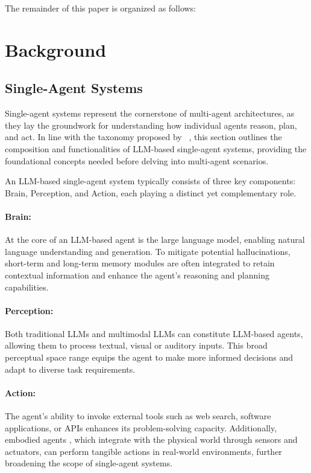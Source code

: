 The remainder of this paper is organized as follows:

\section{Background}
\subsection{Single-Agent Systems}
Single-agent systems represent the cornerstone of multi-agent architectures, as they lay the groundwork for understanding how individual agents reason, plan, and act. In line with the taxonomy proposed by ~\cite{single_agent_survey}, this section outlines the composition and functionalities of LLM-based single-agent systems, providing the foundational concepts needed before delving into multi-agent scenarios.

An LLM-based single-agent system typically consists of three key components: Brain, Perception, and Action, each playing a distinct yet complementary role.

\paragraph{Brain:}At the core of an LLM-based agent is the large language model, enabling natural language understanding and generation. To mitigate potential hallucinations, short-term and long-term memory modules are often integrated to retain contextual information and enhance the agent’s reasoning and planning capabilities.

\paragraph{Perception:}Both traditional LLMs and multimodal LLMs can constitute LLM-based agents, allowing them to process textual, visual or auditory inputs. This broad perceptual space range equips the agent to make more informed decisions and adapt to diverse task requirements.

\paragraph{Action:}The agent's ability to invoke external tools such as web search, software applications, or APIs enhances its problem-solving capacity. Additionally, embodied agents \cite{embodied_agents}, which integrate with the physical world through sensors and actuators, can perform tangible actions in real-world environments, further broadening the scope of single-agent systems.

